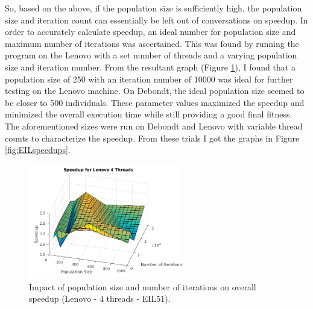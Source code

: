 \documentclass[10pt,letterpaper]{article}
\begin{document}
\newpage
So, based on the above, if the population size is sufficiently high, the population size and iteration count can essentially be left out of conversations on speedup. In order to accurately calculate speedup, an ideal number for population size and maximum number of iterations was ascertained. This was found by running the program on the Lenovo with a set number of threads and a varying population size and iteration number. From the resultant graph (Figure
\ref{fig:popvsiter}), I found that a population size of 250 with an iteration number of 10000 was ideal for further testing on the Lenovo machine. On Debondt, the ideal population size seemed to be closer to 500 individuals. These parameter values maximized the speedup and minimized the overall execution time while still providing a good final fitness. The aforementioned sizes were run on Debondt and Lenovo with variable thread counts to characterize the speedup. From these trials I got the graphs in Figure \ref{fig:EILspeedups}.


\begin{figure}
\centering
\includegraphics[width=0.6\textwidth]{../img/Lenovo_4Thread_PopvsIter.png}
\caption{Impact of population size and number of iterations on overall speedup (Lenovo - 4 threads - EIL51).}
\label{fig:popvsiter}
\end{figure}
\end{document}
